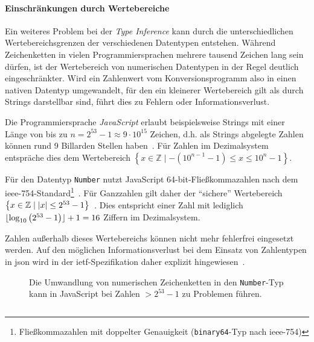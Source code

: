 \paragraph{Einschränkungen durch Wertebereiche}

Ein weiteres Problem bei der \emph{Type Inference} kann durch die unterschiedlichen Wertebereichsgrenzen der verschiedenen Datentypen entstehen.  Während Zeichenketten in vielen Programmiersprachen mehrere tausend Zeichen lang sein dürfen, ist der Wertebereich von numerischen Datentypen in der Regel deutlich eingeschränkter. Wird ein Zahlenwert vom Konversionsprogramm also in einen nativen Datentyp umgewandelt, für den ein kleinerer Wertebereich gilt als durch Strings darstellbar sind, führt dies zu Fehlern oder Informationsverlust.

Die Programmiersprache \emph{JavaScript} erlaubt beispielsweise Strings mit einer Länge von bis zu $n=2^{53}-1 \approx 9 \cdot 10^{15}$ Zeichen, d.h. als Strings abgelegte Zahlen können rund 9 Billarden Stellen haben~\cite[Abschn.~6.1.4]{ecma262}. Für Zahlen im Dezimalsystem entspräche dies dem Wertebereich $\left\{x \in \mathbb{Z} \mid -\left(10^{n-1}-1\right) \leq x \leq 10^{n}-1\right\}$.

Für den Datentyp \texttt{Number} nutzt JavaScript 64-bit-Fließkommazahlen nach dem \acrshort{ieee}-754-Standard\footnote{Fließkommazahlen mit doppelter Genauigkeit (\texttt{binary64}-Typ nach \acrshort{ieee}-754)}~\cite[Abschn.~4.3.20]{ieee754,ecma262}. Für Ganzzahlen gilt daher der \enquote{sichere} Wertebereich $\left\{x \in \mathbb{Z} \mid \lvert x\rvert \leq 2^{53}-1\right\}$~\cite[Abschn.~20.1.2.5]{ecma262}. Dies entspricht einer Zahl mit lediglich $\lfloor\log_{10}\left(2^{53}-1\right)\rfloor+1 = 16$ Ziffern im Dezimalsystem.

Zahlen außerhalb dieses Wertebereichs können nicht mehr fehlerfrei eingesetzt werden. Auf den möglichen Informationsverlust bei dem Einsatz von Zahlentypen in \acrshort{json} wird in der \acrshort{ietf}-Spezifikation daher explizit hingewiesen~\cite[Abschn.~6]{rfc7159}.

\begin{figure}[b!]
\begin{example}
    Die Umwandlung von numerischen Zeichenketten in den \texttt{Number}-Typ kann in JavaScript bei Zahlen $> 2^{53}-1$ zu Problemen führen.
    \inputminted[firstline=2,firstnumber=1,mathescape]{javascript}{typeinference.js}
\end{example}
\end{figure}

